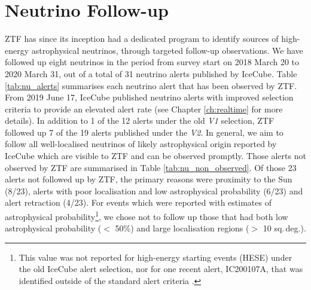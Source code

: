 \section{Neutrino Follow-up}
ZTF has since its inception had a dedicated program to identify sources of high-energy astrophysical neutrinos, through targeted follow-up observations. We have followed up eight neutrinos in the period from survey start on 2018 March 20 to 2020 March 31, out of a total of 31 neutrino alerts published by IceCube. Table \ref{tab:nu_alerts} summarises each neutrino alert that has been observed by ZTF. From 2019 June 17, IceCube published neutrino alerts with improved selection criteria to provide an elevated alert rate  (see Chapter \ref{ch:realtime} for more details). In addition to 1 of the 12 alerts under the old \emph{V1} selection, ZTF followed up 7 of the 19 alerts published under the \emph{V2}. In general, we aim to follow all well-localised neutrinos of likely astrophysical origin reported by IceCube which are visible to ZTF and can be observed promptly. Those alerts not observed by ZTF are summarised in Table \ref{tab:nu_non_observed}. Of those 23 alerts not followed up by ZTF, the primary reasons were proximity to the Sun (8/23), alerts with poor localisation and low astrophysical probability (6/23) and alert retraction (4/23). For events which were reported with estimates of astrophysical probability\footnote{This value was not reported for high-energy starting events (HESE) under the old IceCube alert selection, nor for one recent alert, IC200107A, that was identified outside of the standard alert criteria .}, we chose not to follow up those that had both low astrophysical probability ($<$ 50\%) and large localisation regions ($>$ 10 sq.\,deg.).

